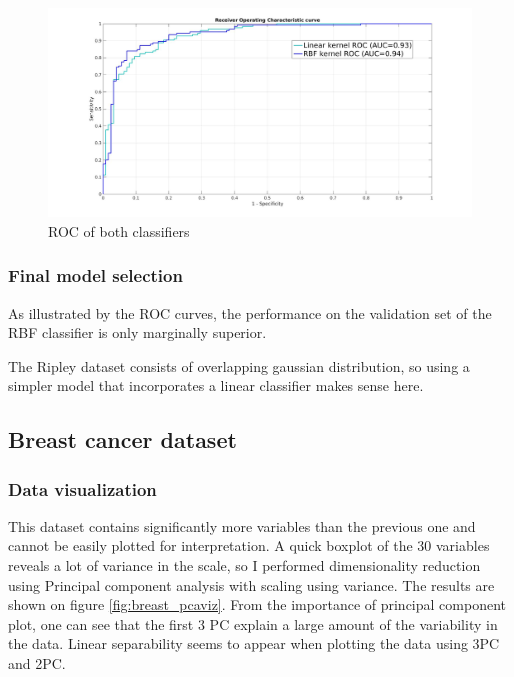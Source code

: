 \documentclass[11pt, a4paper]{article}
\begin{document}
\begin{figure}[H]
    \centering
    \includegraphics[scale=.20]{ripley_roc.jpg}
    \caption{ROC of both classifiers}
    \label{fig:ripley_rbf}
\end{figure}

\subsubsection{Final model selection}
As illustrated by the ROC curves, the performance on the validation
set of the RBF classifier is only marginally superior.

The Ripley dataset consists of overlapping gaussian distribution, so
using a simpler model that incorporates a linear classifier makes
sense here.

\subsection{Breast cancer dataset}

\subsubsection{Data visualization}

This dataset contains significantly more variables than the previous
one and cannot be easily plotted for interpretation. A quick boxplot
of the 30 variables reveals a lot of variance in the scale, so I
performed dimensionality reduction using Principal component analysis
with scaling using variance. The results are shown on figure
\ref{fig:breast_pcaviz}. From the importance of principal component
plot, one can see that the first 3 PC explain a large amount of the
variability in the data. Linear separability seems to appear when
plotting the data using 3PC and 2PC. 
\end{document}
